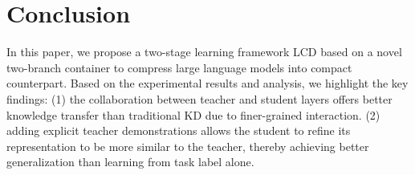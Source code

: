 \section{Conclusion}
In this paper, we propose a two-stage learning framework LCD based on a novel two-branch container to compress large language models into compact 
counterpart. Based on the experimental results and analysis, we highlight the key findings: (1) the collaboration between teacher and student layers offers better knowledge transfer than traditional KD due to 
finer-grained interaction. (2) adding explicit teacher demonstrations allows the student to refine its representation to be more similar to the teacher, thereby achieving better generalization than learning from 
task label alone.
